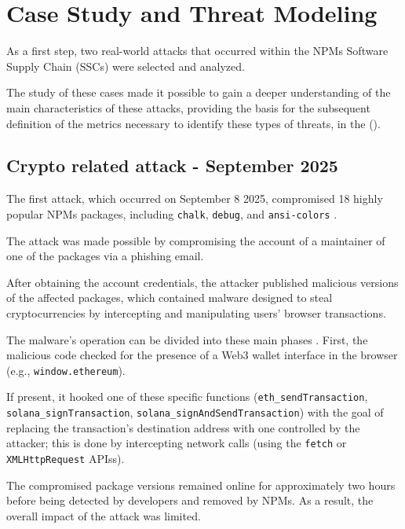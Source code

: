 \chapter{Case Study and Threat Modeling}\label{ch:threatModeling}

As a first step, two real-world attacks that occurred within the \acp{NPM}
Software Supply Chain (\acp{SSC}) were selected and analyzed.

The study of these cases made it possible to gain a deeper understanding
of the main characteristics of these attacks,
providing the basis for the subsequent definition 
of the metrics necessary to identify these types of threats,
in the  ().

\section{Crypto related attack - September 2025}

The first attack, which occurred on September 8 2025,
compromised 18 highly popular \acp{NPM} packages, including \texttt{chalk},
\texttt{debug}, and \texttt{ansi-colors} \cite{henig2025breakdownwidespreadnpmsupplychainattack}.

The attack was made possible by compromising the account of a maintainer of one of the packages via a phishing email.

After obtaining the account credentials,
the attacker published malicious versions of the affected packages,
which contained malware designed to steal cryptocurrencies
by intercepting and manipulating users’ browser transactions.

The malware's operation can be divided into these main phases \cite{matthee2025npmsupplychainattack}.
First, the malicious code checked for the presence of a Web3 wallet interface
in the browser (e.g., \texttt{window.ethereum}).

If present, it hooked one of these specific functions
(\texttt{eth\_send\-Transaction}, \texttt{solana\_sign\-Transaction},
\texttt{solana\_sign\-And\-Send\-Transaction})
with the goal of replacing the transaction's destination address
with one controlled by the attacker; 
this is done by intercepting network calls (using the \texttt{fetch} or \texttt{XMLHttpRequest} \acp{APIs}).

The compromised package versions remained online
for approximately two hours before being detected by developers and removed by \acp{NPM}.
As a result, the overall impact of the attack was limited.

